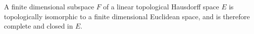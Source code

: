 A finite dimensional subspace $F$ of a linear topological Hausdorff space $E$ is topologically isomorphic to a finite dimensional Euclidean space, and is therefore complete and closed in $E$.
